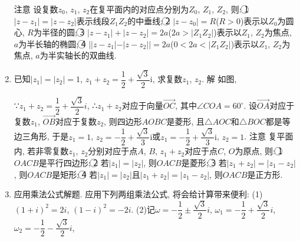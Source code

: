 \documentclass[10pt,a4paper]{article}
\begin{document}
\begin{enumerate}[1.]
\begin{center}
\end{center}
注意  设复数$z_0$, $z_1$, $z_2$在复平面内的对应点分别为$Z_0$, $Z_1$, $Z_2$, 则:
\textcircled{1} $|z-z_1|=|z-z_2|$表示线段$Z_1Z_2$的中垂线;
\textcircled{2} $|z-z_0|=R$($R>0$)表示以$Z_0$为圆心, $R$为半径的圆;
\textcircled{3} $|z-z_1|+|z-z_2|=2a$($2a>|Z_1Z_2|$)表示以$Z_1$, $Z_2$为焦点, $a$为半长轴的椭圆;
\textcircled{4} $||z-z_1|-|z-z_2||=2a$($0<2a<|Z_1Z_2|$)表示以$Z_1$, $Z_2$为焦点, $a$为半实轴长的双曲线.
\item 已知$|z_1|=|z_2|=1$, $z_1+z_2=\dfrac 12+\dfrac{\sqrt 3}2\mathrm{i}$, 求复数$z_1$, $z_2$.
解  如图,
\begin{center}
\end{center}
∵$z_1+z_2=\dfrac 12+\dfrac{\sqrt 3}2i$,
∴$z_1+z_2$对应于向量$\overrightarrow{OC}$, 其中$\angle COA=60^{\circ }$.
设$\overrightarrow{OA}$对应于复数$z_1$, $\overrightarrow{OB}$对应于复数$z_2$, 则四边形$AOBC$是菱形, 且$\triangle AOC$和$\triangle BOC$都是等边三角形, 于是$z_1=1$, $z_2=-\dfrac 12+\dfrac{\sqrt 3}3\mathrm{i}$或$z_1=-\dfrac 12+\dfrac{\sqrt 3}3\mathrm{i}$, $z_2=1$.
注意  复平面内, 若非零复数$z_1$, $z_2$分别对应于点$A$, $B$, $z_1+z_2$对应于点$C$, $O$为原点, 则:
\textcircled{1} $OACB$是平行四边形;
\textcircled{2} 若$|z_1|=|z_2|$, 则$OACB$是菱形;
\textcircled{3} 若$|z_1+z_2|=|z_1-z_2|$, 则$OACB$是矩形;
\textcircled{4} 若$|z_1|=|z_2|$且$|z_1+z_2|=|z_1-z_2|$, 则$OACB$是正方形.
\item 应用乘法公式解题.
应用下列两组乘法公式, 将会给计算带来便利:
(1)$(1+i)^2=2i$, $(1-i)^2=-2i$.
(2)记$\omega =-\dfrac 12\pm \dfrac{\sqrt 3}2i$, $\omega _1=-\dfrac 12+\dfrac{\sqrt 3}2i$, $\omega _2=-\dfrac 12-\dfrac{\sqrt 3}2i$,

\end{enumerate}
\end{document}
